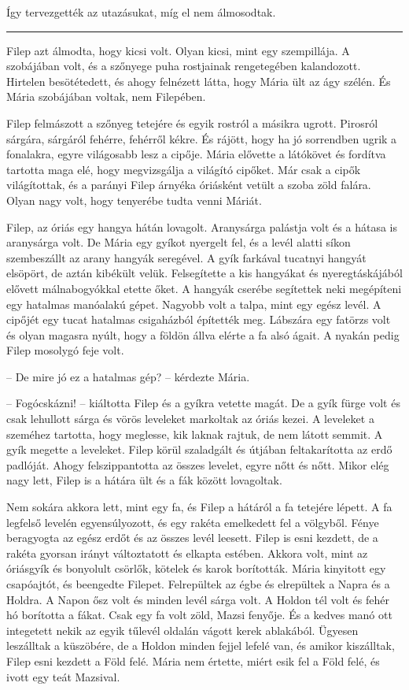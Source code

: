 \documentclass[10pt]{memoir}
\renewcommand{\pfbreakdisplay}{\bigskip \ding{166} \bigskip}
\newcommand{\secbreak}{\fancybreak{\pfbreakdisplay}\indent}
\begin{document}
Így tervezgették az utazásukat, míg el nem álmosodtak.

\secbreak

Filep azt álmodta, hogy kicsi volt. Olyan kicsi, mint egy szempillája. A
szobájában volt, és a szőnyege puha rostjainak rengetegében kalandozott.
Hirtelen besötétedett, és ahogy felnézett látta, hogy Mária ült az ágy szélén.
És Mária szobájában voltak, nem Filepében.

Filep felmászott a szőnyeg tetejére és egyik rostról a másikra ugrott. Pirosról
sárgára, sárgáról fehérre, fehérről kékre. És rájött, hogy ha jó sorrendben
ugrik a fonalakra, egyre világosabb lesz a cipője. Mária elővette a látókövet
és fordítva tartotta maga elé, hogy megvizsgálja a világító cipőket. Már csak a
cipők világítottak, és a parányi Filep árnyéka óriásként vetült a szoba zöld
falára. Olyan nagy volt, hogy tenyerébe tudta venni Máriát.

Filep, az óriás egy hangya hátán lovagolt. Aranysárga palástja volt és a hátasa
is aranysárga volt. De Mária egy gyíkot nyergelt fel, és a levél alatti síkon
szembeszállt az arany hangyák seregével. A gyík farkával tucatnyi hangyát
elsöpört, de aztán kibékült velük. Felsegítette a kis hangyákat és
nyeregtáskájából elővett málnabogyókkal etette őket. A hangyák cserébe
segítettek neki megépíteni egy hatalmas manóalakú gépet. Nagyobb volt a talpa,
mint egy egész levél. A cipőjét egy tucat hatalmas csigaházból építették meg.
Lábszára egy fatörzs volt és olyan magasra nyúlt, hogy a földön állva elérte a
fa alsó ágait. A nyakán pedig Filep mosolygó feje volt.

-- De mire jó ez a hatalmas gép? -- kérdezte Mária.

-- Fogócskázni! -- kiáltotta Filep és a gyíkra vetette magát. De a gyík fürge
volt és csak lehullott sárga és vörös leveleket markoltak az óriás kezei. A
leveleket a szeméhez tartotta, hogy meglesse, kik laknak rajtuk, de nem látott
semmit. A gyík megette a leveleket. Filep körül szaladgált és útjában
feltakarította az erdő padlóját. Ahogy felszippantotta az összes levelet, egyre
nőtt és nőtt. Mikor elég nagy lett, Filep is a hátára ült és a fák között
lovagoltak.

Nem sokára akkora lett, mint egy fa, és Filep a hátáról a fa tetejére lépett. A
fa legfelső levelén egyensúlyozott, és egy rakéta emelkedett fel a völgyből.
Fénye beragyogta az egész erdőt és az összes levél leesett. Filep is esni
kezdett, de a rakéta gyorsan irányt változtatott és elkapta estében. Akkora
volt, mint az óriásgyík és bonyolult csörlők, kötelek és karok borították.
Mária kinyitott egy csapóajtót, és beengedte Filepet. Felrepültek az égbe és
elrepültek a Napra és a Holdra. A Napon ősz volt és minden levél sárga volt. A
Holdon tél volt és fehér hó borította a fákat. Csak egy fa volt zöld, Mazsi
fenyője. És a kedves manó ott integetett nekik az egyik tűlevél oldalán vágott
kerek ablakából. Ügyesen leszálltak a küszöbére, de a Holdon minden fejjel
lefelé van, és amikor kiszálltak, Filep esni kezdett a Föld felé. Mária nem
értette, miért esik fel a Föld felé, és ivott egy teát Mazsival.
\end{document}
